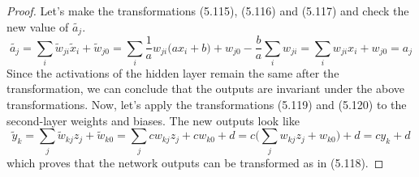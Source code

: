 \begin{proof}
    Let's make the transformations (5.115), (5.116) and (5.117) and check the new
    value of $\widetilde{a_j}$.
    \[
        \widetilde{a_j} 
        = \sum_{i} \widetilde{w}_{ji} \widetilde{x}_i + \widetilde{w}_{j0} 
        = \sum_{i} \frac{1}{a} w_{ji} \big(ax_i + b) + w_{j0} - \frac{b}{a} \sum_{i} w_{ji} 
        = \sum_{i} w_{ji} x_i + w_{j0} 
        = a_j
    \] 
    Since the activations of the hidden layer remain the same after the transformation,
    we can conclude that the outputs are invariant under the above transformations.
    Now, let's apply the transformations (5.119) and (5.120) to the second-layer weights
    and biases. The new outputs look like
    \[
        \widetilde{y}_k 
        = \sum_{j} \widetilde{w}_{kj} z_j + \widetilde{w}_{k0}
        = \sum_{j} c w_{kj} z_j + cw_{k0} + d
        = c\bigg(\sum_{j} w_{kj}z_j + w_{k0}\bigg) + d
        = cy_k + d
    \] 
    which proves that the network outputs can be transformed as in (5.118).
\end{proof}

